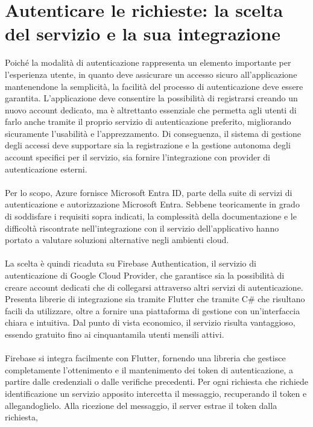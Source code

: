 
\section{Autenticare le richieste: la scelta del servizio e la sua integrazione}


Poiché la modalità di autenticazione rappresenta 
un elemento importante per l'esperienza utente, 
in quanto deve assicurare un accesso sicuro all'applicazione mantenendone la semplicità, 
la facilità del processo di autenticazione deve essere garantita.
L'applicazione deve consentire la possibilità di registrarsi creando un nuovo account dedicato,
ma è altrettanto essenziale che permetta agli utenti di farlo anche 
tramite il proprio servizio di autenticazione preferito,
migliorando sicuramente l'usabilità e l'apprezzamento.
Di conseguenza, il sistema di gestione degli accessi deve supportare 
sia la registrazione e la gestione autonoma degli account specifici per il servizio, 
sia fornire l'integrazione con provider di autenticazione esterni.\\
\\
Per lo scopo, Azure fornisce Microsoft Entra ID, 
parte della suite di servizi di autenticazione e autorizzazione Microsoft Entra. 
Sebbene teoricamente in grado di soddisfare i requisiti sopra indicati, 
la complessità della documentazione e le difficoltà riscontrate nell'integrazione con il servizio dell’applicativo
hanno portato a valutare soluzioni alternative negli ambienti cloud.\\
\\
La scelta è quindi ricaduta su Firebase Authentication,
il servizio di autenticazione di Google Cloud Provider, 
che garantisce sia la possibilità di creare account dedicati 
che di collegarsi attraverso altri servizi di autenticazione. 
Presenta librerie di integrazione sia tramite Flutter che tramite C\# 
che risultano facili da utilizzare,
oltre a fornire una piattaforma di gestione con un'interfaccia chiara e intuitiva.
Dal punto di vista economico, il servizio risulta vantaggioso, 
essendo gratuito fino ai cinquantamila utenti mensili attivi.\\
\\
Firebase si integra facilmente con Flutter,
fornendo una libreria che gestisce completamente l'ottenimento e il mantenimento dei token di autenticazione,
a partire dalle credenziali o dalle verifiche precedenti.
Per ogni richiesta che richiede identificazione un servizio apposito intercetta il messaggio, 
recuperando il token e allegandoglielo.
Alla ricezione del messaggio, il server estrae il token dalla richiesta,
